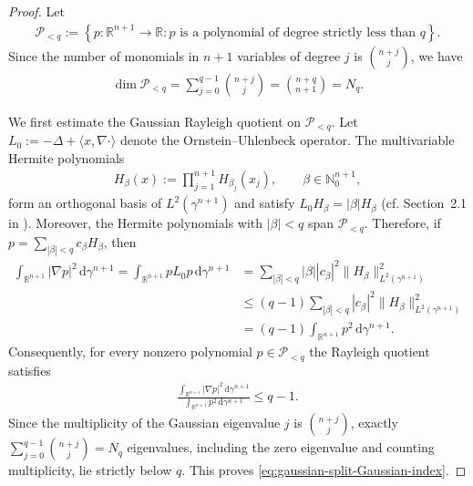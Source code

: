 \documentclass[11pt,reqno]{amsart}
\numberwithin{equation}{section}
\theoremstyle{definition}
\theoremstyle{remark}
\def\cP {\mathcal{P}}
\newcommand{\la}{\langle}
\newcommand{\ra}{\rangle}
\newcommand{\ud}{\mathrm{d}}
\newcommand{\0}{\emptyset}
\newcommand{\bbN}{\mathbb N}
\newcommand{\bbR}{\mathbb R}
\newcommand{\calP}{\mathcal P}
\begin{document}
\begin{proof}
Let
\begin{align}
        \cP_{<q}
        :=
        \left\{
        p:\bbR^{n+1}\to\bbR:
        p\text{ is a polynomial of degree strictly less than }q
        \right\}.
\end{align}
Since the number of monomials in $n+1$ variables of degree $j$ is
$\binom{n+j}{j}$, we have
\begin{align}\label{eq:gaussian-split-polynomial-count}
        \dim\cP_{<q}
        =
        \sum_{j=0}^{q-1}\binom{n+j}{j}
        =
        \binom{n+q}{n+1}
        =
        N_q.
\end{align}

We first estimate the Gaussian Rayleigh quotient on $\cP_{<q}$. Let
$L_0:=-\Delta+\la x,\nabla\cdot\ra$ denote the Ornstein--Uhlenbeck operator. The multivariable Hermite polynomials
\begin{align}
        H_\beta(x)
        :=
        \prod_{j=1}^{n+1}H_{\beta_j}(x_j),
        \qquad
        \beta\in\bbN_0^{n+1},
\end{align}
form an orthogonal basis of $L^2(\gamma^{n+1})$ and satisfy
$L_0H_\beta=|\beta|H_\beta$ (cf. Section~2.1 in
\cite{milman2018spectral}). Moreover, the Hermite polynomials with
$|\beta|<q$ span $\cP_{<q}$. Therefore, if
$p=\sum_{|\beta|<q}c_\beta H_\beta$, then
\begin{align}
        \int_{\bbR^{n+1}}|\nabla p|^2\,\ud\gamma^{n+1}
        =
        \int_{\bbR^{n+1}}pL_0p\,\ud\gamma^{n+1}
        &=
        \sum_{|\beta|<q}
        |\beta||c_\beta|^2
        \|H_\beta\|_{L^2(\gamma^{n+1})}^2\\
        &\leq
        (q-1)
        \sum_{|\beta|<q}
        |c_\beta|^2
        \|H_\beta\|_{L^2(\gamma^{n+1})}^2\\
        &= 
        (q-1)
        \int_{\bbR^{n+1}}p^2\,\ud\gamma^{n+1}.
\end{align}
Consequently, for every nonzero polynomial $p\in \calP_{<q}$ the Rayleigh quotient satisfies
\begin{align}\label{eq:gaussian-split-lower-polynomial-Gaussian}
        \frac{
        \int_{\bbR^{n+1}}|\nabla p|^2\,\ud\gamma^{n+1}
        }{
        \int_{\bbR^{n+1}}p^2\,\ud\gamma^{n+1}
        }
        \leq
        q-1.
\end{align}
Since the multiplicity of the Gaussian eigenvalue $j$ is
$\binom{n+j}{j}$, exactly $\sum_{j=0}^{q-1}\binom{n+j}{j}=N_q$ eigenvalues, including the zero
eigenvalue and counting multiplicity, lie strictly below $q$. This proves
\eqref{eq:gaussian-split-Gaussian-index}.


\end{proof}
\end{document}
